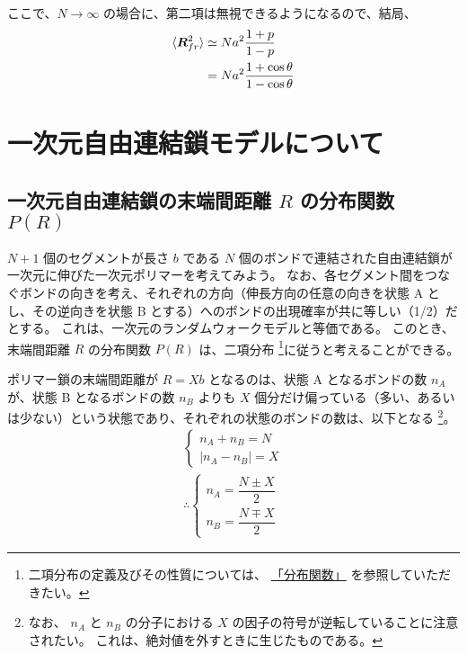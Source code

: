 \documentclass[a4paper,11pt]{ltjsarticle}
\begin{document}
\begin{appendix}
ここで、$N \rightarrow \infty$ の場合に、第二項は無視できるようになるので、結局、
\begin{align*}
	\langle \bm{R}_{fr}^2 \rangle
		&\simeq N a^2 \dfrac{1+p}{1-p} \notag \\
		&= N a^2 \dfrac{1+\cos \theta}{1-\cos \theta}
\end{align*}

\newpage

\section{一次元自由連結鎖モデルについて}
\label{sec:1DRW}

\subsection{一次元自由連結鎖の末端間距離 $R$ の分布関数 $P(R)$}
\label{ssec:1DRW_PR}

$N+1$ 個のセグメントが長さ $b$ である $N$ 個のボンドで連結された自由連結鎖が一次元に伸びた一次元ポリマーを考えてみよう。
なお、各セグメント間をつなぐボンドの向きを考え、それぞれの方向（伸長方向の任意の向きを状態 A とし、その逆向きを状態 B とする）へのボンドの出現確率が共に等しい（1/2）だとする。
これは、一次元のランダムウォークモデルと等価である。
このとき、末端間距離 $R$ の分布関数 $P(R)$ は、二項分布
\footnote
{
二項分布の定義及びその性質については、
\href{https://dl.dropboxusercontent.com/u/18899343/Probability/Prob_Dist/Prob_Dist.pdf}{「分布関数」}
を参照していただきたい。
}に従うと考えることができる。

ポリマー鎖の末端間距離が $R = Xb$ となるのは、状態 A となるボンドの数 $n_A$ が、状態 B となるボンドの数 $n_B$ よりも $X$ 個分だけ偏っている（多い、あるいは少ない）という状態であり、それぞれの状態のボンドの数は、以下となる
\footnote
{
なお、 $n_A$ と $n_B$ の分子における $X$ の因子の符号が逆転していることに注意されたい。
これは、絶対値を外すときに生じたものである。
}。
\begin{align*}
\begin{cases}
n_A +n_B = N \\[8pt]
| n_A - n_B | = X
\end{cases}\\[10pt]
\therefore
\begin{cases}
n_A = \dfrac{N \pm X}{2} \\[8pt]
n_B = \dfrac{N \mp X}{2}
\end{cases}
\end{align*}


\end{appendix}
\end{document}
